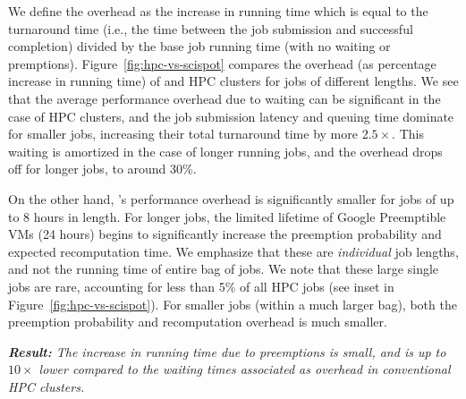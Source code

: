 We define the overhead as the increase in running time which is equal to the turnaround time (i.e., the time between the job submission and successful completion) divided by the base job running time (with no waiting or premptions). 
Figure~\ref{fig:hpc-vs-scispot} compares the overhead (as percentage increase in running time) of \sysname and HPC clusters  for jobs of different lengths. We see that the average performance overhead due to waiting can be significant in the case of HPC clusters, and the job submission latency and queuing time dominate for smaller jobs, increasing their total turnaround time by more $2.5\times$.
This waiting is amortized in the case of longer running jobs, and the overhead drops off for longer jobs, to around 30\%.

On the other hand, \sysname's performance overhead is significantly smaller for jobs of up to 8 hours in length.
For longer jobs, the limited lifetime of Google Preemptible VMs (24 hours) begins to significantly increase the preemption probability and expected recomputation time.
We emphasize that these are \emph{individual} job lengths, and not the running time of entire bag of jobs.
We note that these large single jobs are rare, accounting for less than 5\% of all HPC jobs (see inset in Figure~\ref{fig:hpc-vs-scispot}).
For smaller jobs (within a much larger bag), both the preemption probability and recomputation overhead is much smaller. 

\noindent \emph{\textbf{Result:} The increase in running time due to preemptions is small, and is up to $10\times$ lower compared to the waiting times associated as overhead in conventional HPC clusters. }

% 
% 

